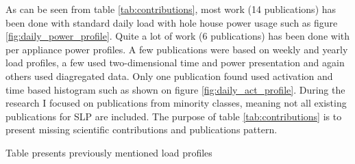 As can be seen from table \ref{tab:contributions}, most work (14 publications) has been done with standard daily load with
hole house power usage such as figure \ref{fig:daily_power_profile}. 
Quite a lot of work (6 publications) has been done with per appliance power profiles.
A few publications were based on weekly and yearly load profiles,
a few used two-dimensional time and power presentation and again others used diagregated data.
Only one publication found used activation and time based histogram such as 
shown on figure \ref{fig:daily_act_profile}. During the research I focused on publications
from minority classes, meaning not all existing publications for SLP are included. 
The purpose of table \ref{tab:contributions} is to present missing scientific contributions 
and publications pattern.  

\begin{table}[H]
	\caption{Table presents previously mentioned load profiles}
	\label{tab:contributions}


\end{table}
